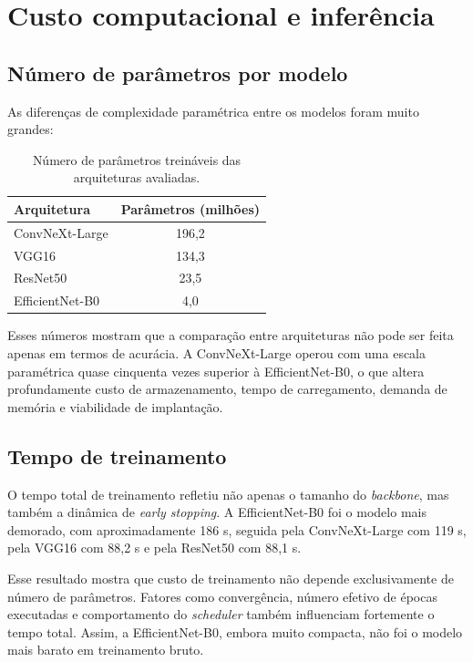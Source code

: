 \documentclass[tcc,capa]{texufpel}
\begin{document}
\section{Custo computacional e inferência}

\subsection{Número de parâmetros por modelo}

As diferenças de complexidade paramétrica entre os modelos foram muito grandes:

\begin{table}[h]
	\centering
	\caption{Número de parâmetros treináveis das arquiteturas avaliadas.}
	\label{tab:parametros_modelos}
	\begin{tabular}{lc}
		\hline
		\textbf{Arquitetura} & \textbf{Parâmetros (milhões)} \\
		\hline
		ConvNeXt-Large  & 196{,}2 \\
		VGG16           & 134{,}3 \\
		ResNet50        & 23{,}5 \\
		EfficientNet-B0 & 4{,}0 \\
		\hline
	\end{tabular}
\end{table}

Esses números mostram que a comparação entre arquiteturas não pode ser feita apenas em termos de acurácia. A ConvNeXt-Large operou com uma escala paramétrica quase cinquenta vezes superior à EfficientNet-B0, o que altera profundamente custo de armazenamento, tempo de carregamento, demanda de memória e viabilidade de implantação.

\subsection{Tempo de treinamento}

O tempo total de treinamento refletiu não apenas o tamanho do \textit{backbone}, mas também a dinâmica de \textit{early stopping}. A EfficientNet-B0 foi o modelo mais demorado, com aproximadamente 186 s, seguida pela ConvNeXt-Large com 119 s, pela VGG16 com 88,2 s e pela ResNet50 com 88,1 s.

Esse resultado mostra que custo de treinamento não depende exclusivamente de número de parâmetros. Fatores como convergência, número efetivo de épocas executadas e comportamento do \textit{scheduler} também influenciam fortemente o tempo total. Assim, a EfficientNet-B0, embora muito compacta, não foi o modelo mais barato em treinamento bruto.
\end{document}
